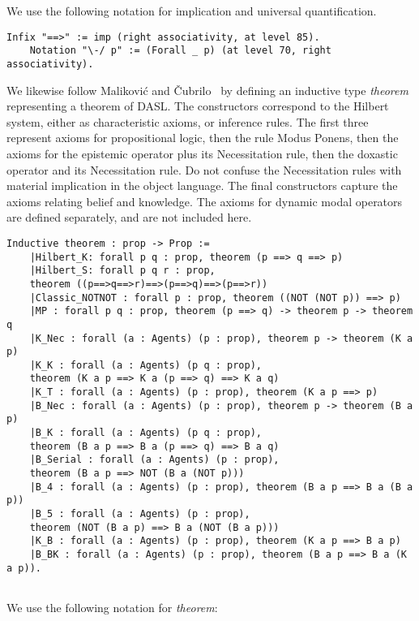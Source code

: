 We use the following notation for implication and universal quantification.
\begin{tcolorbox}
	\begin{lstlisting}[language=Coq]
	Infix "==>" := imp (right associativity, at level 85).
	Notation "\-/ p" := (Forall _ p) (at level 70, right associativity).
	\end{lstlisting}
\end{tcolorbox}
We likewise follow Malikovi\'c and \v Cubrilo~\cite{delcoq1,delcoq2} by defining an inductive type \emph{theorem} representing a theorem of DASL. The constructors correspond to the Hilbert system, either as characteristic axioms, or inference rules. The first three represent axioms for propositional logic, then the rule Modus Ponens, then the axioms for the epistemic operator plus its Necessitation rule, then the doxastic operator and its Necessitation rule. Do not confuse the Necessitation rules with material implication in the object language. The final constructors capture the axioms relating belief and knowledge. The axioms for dynamic modal operators are defined separately, and are not included here.
\begin{tcolorbox}
	\begin{lstlisting}[language=Coq]
	Inductive theorem : prop -> Prop :=
	|Hilbert_K: forall p q : prop, theorem (p ==> q ==> p)
	|Hilbert_S: forall p q r : prop, 
	theorem ((p==>q==>r)==>(p==>q)==>(p==>r))
	|Classic_NOTNOT : forall p : prop, theorem ((NOT (NOT p)) ==> p)
	|MP : forall p q : prop, theorem (p ==> q) -> theorem p -> theorem q
	|K_Nec : forall (a : Agents) (p : prop), theorem p -> theorem (K a p)
	|K_K : forall (a : Agents) (p q : prop), 
	theorem (K a p ==> K a (p ==> q) ==> K a q)
	|K_T : forall (a : Agents) (p : prop), theorem (K a p ==> p)
	|B_Nec : forall (a : Agents) (p : prop), theorem p -> theorem (B a p)
	|B_K : forall (a : Agents) (p q : prop), 
	theorem (B a p ==> B a (p ==> q) ==> B a q)
	|B_Serial : forall (a : Agents) (p : prop), 
	theorem (B a p ==> NOT (B a (NOT p)))
	|B_4 : forall (a : Agents) (p : prop), theorem (B a p ==> B a (B a p))
	|B_5 : forall (a : Agents) (p : prop), 
	theorem (NOT (B a p) ==> B a (NOT (B a p)))
	|K_B : forall (a : Agents) (p : prop), theorem (K a p ==> B a p)
	|B_BK : forall (a : Agents) (p : prop), theorem (B a p ==> B a (K a p)).
	
	\end{lstlisting}\end{tcolorbox}
We use the following notation for \emph{theorem}:
